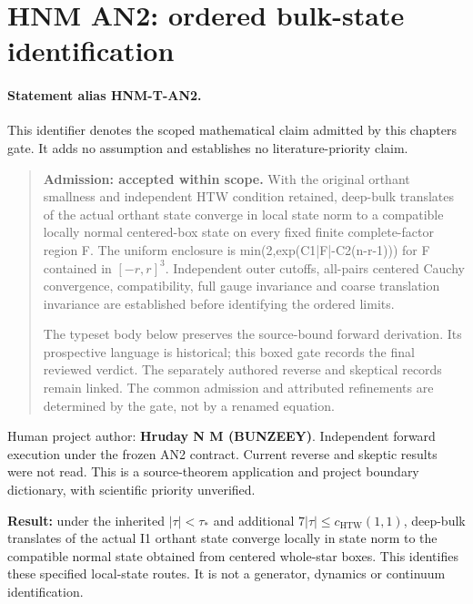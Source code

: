 \hypertarget{r29-an2-an2-forward-hnm-ordered-bulk-state-identification}{%
\section{HNM AN2: ordered bulk-state identification\workstar}\label{r29:an2:r29-an2-an2-forward-hnm-ordered-bulk-state-identification}}
\paragraph{Statement alias HNM-T-AN2.}\label{stmt:AN2} This identifier denotes the scoped mathematical claim admitted by this chapter\textquotesingle s gate. It adds no assumption and establishes no literature-priority claim.

\begin{quote}\small \textbf{Admission: accepted within scope.} With the original orthant smallness and independent HTW condition retained, deep-bulk translates of the actual orthant state converge in local state norm to a compatible locally normal centered-box state on every fixed finite complete-factor region F. The uniform enclosure is min(2,exp(C1|F|-C2(n-r-1))) for F contained in \([-r,r]^{3}\). Independent outer cutoffs, all-pairs centered Cauchy convergence, compatibility, full gauge invariance and coarse translation invariance are established before identifying the ordered limits.\par The typeset body below preserves the source-bound forward derivation. Its prospective language is historical; this boxed gate records the final reviewed verdict. The separately authored reverse and skeptical records remain linked. The common admission and attributed refinements are determined by the gate, not by a renamed equation.\end{quote}
Human project author: \textbf{Hruday N M (BUNZEEY)}. Independent forward execution under the frozen AN2 contract. Current reverse and skeptic results were not read. This is a source-theorem application and project boundary dictionary, with scientific priority unverified.

\textbf{Result:} under the inherited \(|\tau|<\tau_*\) and additional \(7|\tau|\le c_{\mathrm{HTW}}(1,1)\), deep-bulk translates of the actual I1 orthant state converge locally in state norm to the compatible normal state obtained from centered whole-star boxes. This identifies these specified local-state routes. It is not a generator, dynamics or continuum identification.

